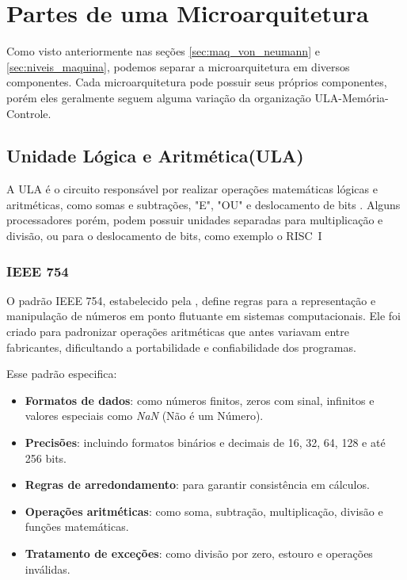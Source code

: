 \documentclass[
	12pt,				%
	openright,			%
	oneside,			%
	a4paper,			%
	english,			%
	french,				%
	spanish,			%
	brazil,				%
	]{abntex2}
\begin{document}
\section{Partes de uma Microarquitetura}
Como visto anteriormente nas seções \ref{sec:maq_von_neumann} e \ref{sec:niveis_maquina}, podemos separar a microarquitetura em diversos componentes. Cada microarquitetura pode possuir seus próprios componentes, porém eles geralmente seguem alguma variação da organização ULA-Memória-Controle.

\subsection{Unidade Lógica e Aritmética(ULA)}\label{sec:ULA}
A ULA é o circuito responsável por realizar operações matemáticas lógicas e aritméticas, como somas e subtrações, "E", "OU" e deslocamento de bits \cite[p.60]{favero_organizacao_2011}.
Alguns processadores porém, podem possuir unidades separadas para multiplicação e divisão, ou para o deslocamento de bits, como exemplo o RISC~I\cite[p.13]{catsoulis_designing_2002}

\subsubsection{IEEE 754}
O padrão IEEE 754, estabelecido pela , define regras para a representação e manipulação de números em ponto flutuante em sistemas computacionais. Ele foi criado para padronizar operações aritméticas que antes variavam entre fabricantes, dificultando a portabilidade e confiabilidade dos programas.

Esse padrão especifica:
\begin{itemize}
    \item \textbf{Formatos de dados}: como números finitos, zeros com sinal, infinitos e valores especiais como \textit{NaN} (Não é um Número).
    \item \textbf{Precisões}: incluindo formatos binários e decimais de 16, 32, 64, 128 e até 256 bits.
    \item \textbf{Regras de arredondamento}: para garantir consistência em cálculos.
    \item \textbf{Operações aritméticas}: como soma, subtração, multiplicação, divisão e funções matemáticas.
    \item \textbf{Tratamento de exceções}: como divisão por zero, estouro e operações inválidas.
\end{itemize}
\end{document}
